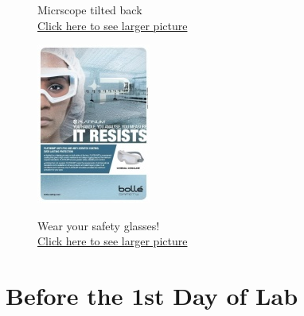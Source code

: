 \documentclass{../lab}
\begin{document}
\begin{figure}[H]
  \caption{Micrscope tilted back \\
  \href{http://experimentationlab.berkeley.edu/sites/default/files/upimages/1_Tilt-Microscope_2542.JPG}{Click here to see larger picture}}
  \label{fig:TiltMicroscope}
\endminipage\hfill
{}
  \href{http://experimentationlab.berkeley.edu/sites/default/files/upimages/6_eye-wear-face.jpg}{\includegraphics[width=\linewidth,keepaspectratio]{images/6_eye-wear-face_small.jpg}}
  \caption{Wear your safety glasses! \\ \href{http://experimentationlab.berkeley.edu/sites/default/files/upimages/6_eye-wear-face.jpg}{Click here to see larger picture}}\label{fig:EyeWear}
\endminipage
\end{figure}

\section{Before the 1st Day of Lab}
\end{document}
